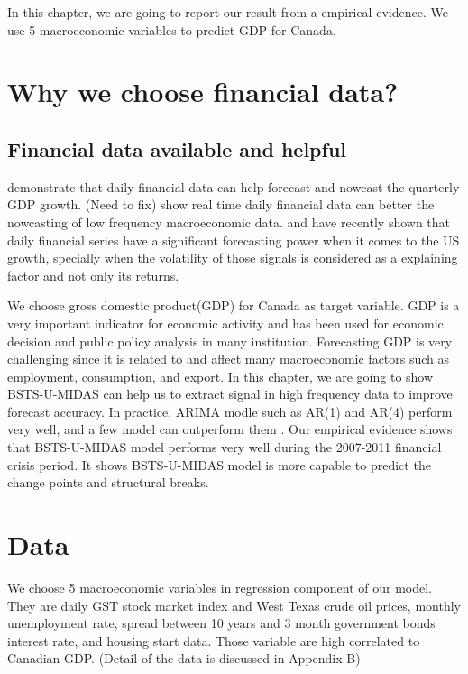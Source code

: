 \label{chapter:Exp}

In this chapter, we are going to report our result from a empirical evidence. We use 5 macroeconomic variables to predict GDP for Canada. 

\section{Why we choose financial data?}

\subsection{Financial data available and helpful}

 demonstrate that daily financial data can help forecast and nowcast the quarterly GDP growth. (Need to fix)   show  real time daily financial data can better the nowcasting of low frequency macroeconomic data.    and    have recently shown that  daily financial series have a significant forecasting power when it comes to the US growth, specially when the volatility of those signals is considered as a explaining factor and not only its returns. 


We choose gross domestic product(GDP) for Canada as target variable. GDP is a very important indicator for economic activity and has been used for economic decision and public policy analysis in many institution. Forecasting GDP is very challenging since it is related to and affect many macroeconomic factors such as employment, consumption, and  export. In this chapter, we are going to show BSTS-U-MIDAS can help us to extract signal in high frequency data to improve forecast accuracy. In practice, ARIMA modle such as AR(1) and AR(4) perform very well, and a few model can outperform them \cite{Koopman2013}. Our empirical evidence shows that BSTS-U-MIDAS model performs very well during the 2007-2011 financial crisis period. It shows BSTS-U-MIDAS model is more capable to predict the change points and structural breaks.     


  




\section{Data}

We choose 5 macroeconomic variables in regression component of our model. They are daily GST stock market index and West Texas crude oil prices, monthly unemployment rate, spread between 10 years and 3 month government bonds interest rate, and  housing start data. Those variable are high correlated to Canadian GDP. (Detail of the data is discussed in Appendix B)


